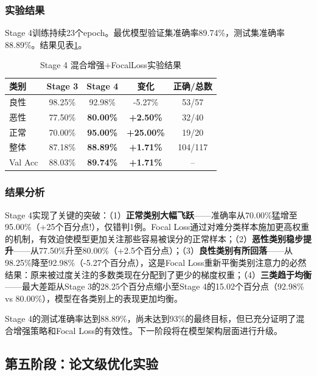 \subsubsection{实验结果}

Stage 4训练持续23个epoch。最优模型验证集准确率89.74\%，测试集准确率88.89\%。结果见表\ref{tbl:stage4_results}。

\begin{table}[htb]
    \centering
    \caption{Stage 4 混合增强+FocalLoss实验结果}
    \label{tbl:stage4_results}
    \begin{tabular}{lcccc}
        \toprule
        类别 & Stage 3 & Stage 4 & 变化 & 正确/总数 \\
        \midrule
        良性    & 98.25\% & 92.98\% & -5.27\% & 53/57 \\
        恶性    & 77.50\% & \textbf{80.00\%} & \textbf{+2.50\%} & 32/40 \\
        正常    & 70.00\% & \textbf{95.00\%} & \textbf{+25.00\%} & 19/20 \\
        \midrule
        整体    & 87.18\% & \textbf{88.89\%} & \textbf{+1.71\%} & 104/117 \\
        Val Acc & 88.03\% & \textbf{89.74\%} & \textbf{+1.71\%} & -- \\
        \bottomrule
    \end{tabular}
\end{table}

\subsubsection{结果分析}

Stage 4实现了关键的突破：（1）\textbf{正常类别大幅飞跃}——准确率从70.00\%猛增至95.00\%（+25个百分点!），仅错判1例。Focal Loss通过对难分类样本施加更高权重的机制，有效迫使模型更加关注那些容易被误分的正常样本；（2）\textbf{恶性类别稳步提升}——从77.50\%升至80.00\%（+2.5个百分点）；（3）\textbf{良性类别有所回落}——从98.25\%降至92.98\%（-5.27个百分点），这是Focal Loss重新平衡类别注意力的必然结果：原来被过度关注的多数类现在分配到了更少的梯度权重；（4）\textbf{三类趋于均衡}——最大差距从Stage 3的28.25个百分点缩小至Stage 4的15.02个百分点（92.98\% vs 80.00\%），模型在各类别上的表现更加均衡。

Stage 4的测试准确率达到88.89\%，尚未达到93\%的最终目标，但已充分证明了混合增强策略和Focal Loss的有效性。下一阶段将在模型架构层面进行升级。


\subsection{第五阶段：论文级优化实验}

